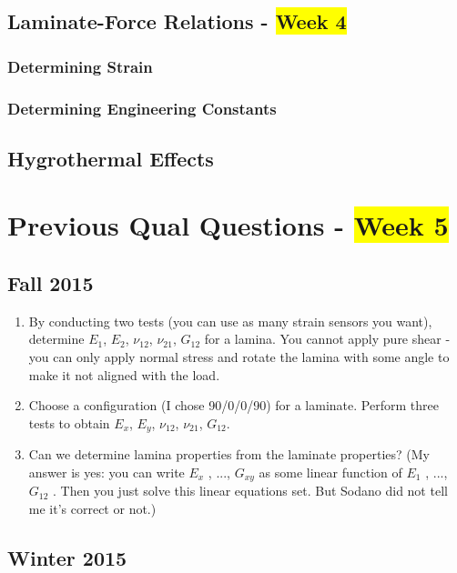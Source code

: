 \documentclass[11pt]{article}
\begin{document}
    \subsection{Laminate-Force Relations - \colorbox{Yellow}{Week 4}}

    \subsubsection{Determining Strain}

    \subsubsection{Determining Engineering Constants}

    \subsection{Hygrothermal Effects}

    \section{Previous Qual Questions - \colorbox{Yellow}{Week 5}}

    \subsection{Fall 2015}

    \begin{enumerate}
    \item{By conducting two tests (you can use as many strain sensors you want), determine $E_1$, $E_2$, $\nu_{12}$, $\nu_{21}$, $G_{12}$
for a lamina. You cannot apply pure shear - you can only apply normal stress and rotate the lamina
with some angle to make it not aligned with the load.}
    \item{Choose a configuration (I chose 90/0/0/90) for a laminate. Perform three tests to obtain $E_x$, $E_y$, $\nu_{12}$, $\nu_{21}$, $G_{12}$.}
    \item{Can we determine lamina properties from the laminate properties? (My answer is
yes: you can write $E_x$ , ..., $G_{xy}$ as some linear function of $E_1$ , ..., $G_{12}$ . Then you just solve this linear
equations set. But Sodano did not tell me it’s correct or not.)}
    \end{enumerate}

    \subsection{Winter 2015}
\end{document}

